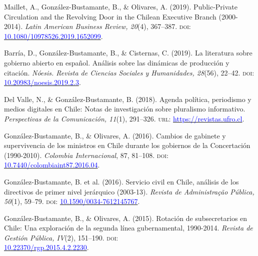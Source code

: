 \begin{publications}
\begin{benumerate}{10}
\item{\small Maillet, A., González-Bustamante, B., \& Olivares, A. (2019). Public-Private Circulation and the Revolving Door in the Chilean Executive Branch (2000-2014). {\itshape Latin American Business Review, 20}(4), 367--387. {\scshape doi}: \\ \href{https://doi.org/10.1080/10978526.2019.1652099}{\textcolor{blue}{10.1080/10978526.2019.1652099}}.}\vspace{1mm}

\item{\small Barría, D., González-Bustamante, B., \& Cisternas, C. (2019). La literatura sobre gobierno abierto en español. Análisis sobre las dinámicas de producción y citación. {\itshape Nóesis. Revista de Ciencias Sociales y Humanidades, 28}(56), 22--42. {\scshape doi}: \href{http://dx.doi.org/10.20983/noesis.2019.2.3}{\textcolor{blue}{10.20983/noesis.2019.2.3}}.}\vspace{1mm}

\item{\small Del Valle, N., \& González-Bustamante, B. (2018). Agenda política, periodismo y medios digitales en Chile: Notas de investigación sobre pluralismo informativo. {\itshape Perspectivas de la Comunicación, 11}(1), 291--326. {\scshape url:} \href{https://revistas.ufro.cl/ojs/index.php/perspectivas/article/view/1146}{\textcolor{blue}{https://revistas.ufro.cl}}.}\vspace{1mm}

\item{\small González-Bustamante, B., \& Olivares, A. (2016). Cambios de gabinete y supervivencia de los ministros en Chile durante los gobiernos de la Concertación (1990-2010). {\itshape Colombia Internacional}, 87, 81--108. {\scshape doi}: \\ \href{https://doi.org/10.7440/colombiaint87.2016.04}{\textcolor{blue}{10.7440/colombiaint87.2016.04}}.}\vspace{1mm}

\item{\small González-Bustamante, B. et al. (2016). Servicio civil en Chile, análisis de los directivos de primer nivel jerárquico (2003-13). {\itshape Revista de Administra\c{c}\~ao Pública, 50}(1), 59--79. {\scshape doi}: \href{http://dx.doi.org/10.1590/0034-7612145767}{\textcolor{blue}{10.1590/0034-7612145767}}.} \vspace{1mm}

\item{\small González-Bustamante, B., \& Olivares, A. (2015). Rotación de subsecretarios en Chile: Una exploración de la segunda línea gubernamental, 1990-2014. {\itshape Revista de Gestión Pública, IV}(2), 151--190. {\scshape doi}: \\ \href{https://doi.org/10.22370/rgp.2015.4.2.2230}{\textcolor{blue}{10.22370/rgp.2015.4.2.2230}}.} \vspace{1mm}

\end{benumerate}

\end{publications}

